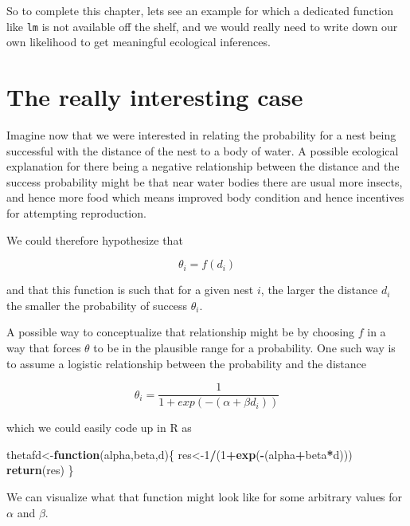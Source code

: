 \documentclass[
]{book}
\newenvironment{Shaded}{\begin{snugshade}}{\end{snugshade}}
\newcommand{\ControlFlowTok}[1]{\textcolor[rgb]{0.13,0.29,0.53}{\textbf{#1}}}
\newcommand{\DecValTok}[1]{\textcolor[rgb]{0.00,0.00,0.81}{#1}}
\newcommand{\KeywordTok}[1]{\textcolor[rgb]{0.13,0.29,0.53}{\textbf{#1}}}
\newcommand{\NormalTok}[1]{#1}
\newcommand{\OperatorTok}[1]{\textcolor[rgb]{0.81,0.36,0.00}{\textbf{#1}}}
\begin{document}
So to complete this chapter, lets see an example for which a dedicated function like \texttt{lm} is not available off the shelf, and we would really need to write down our own likelihood to get meaningful ecological inferences.

\hypertarget{the-really-interesting-case}{%
\section{The really interesting case}\label{the-really-interesting-case}}

Imagine now that we were interested in relating the probability for a nest being successful with the distance of the nest to a body of water. A possible ecological explanation for there being a negative relationship between the distance and the success probability might be that near water bodies there are usual more insects, and hence more food which means improved body condition and hence incentives for attempting reproduction.

We could therefore hypothesize that

\[\theta_i=f(d_i)\]

and that this function is such that for a given nest \(i\), the larger the distance \(d_i\) the smaller the probability of success \(\theta_i\).

A possible way to conceptualize that relationship might be by choosing \(f\) in a way that forces \(\theta\) to be in the plausible range for a probability. One such way is to assume a logistic relationship between the probability and the distance

\[\theta_i=\frac{1}{1+exp(-(\alpha+\beta d_i))}\]

which we could easily code up in R as

\begin{Shaded}
\begin{Highlighting}[]
\NormalTok{thetafd<-}\ControlFlowTok{function}\NormalTok{(alpha,beta,d)\{}
\NormalTok{  res<-}\DecValTok{1}\OperatorTok{/}\NormalTok{(}\DecValTok{1}\OperatorTok{+}\KeywordTok{exp}\NormalTok{(}\OperatorTok{-}\NormalTok{(alpha}\OperatorTok{+}\NormalTok{beta}\OperatorTok{*}\NormalTok{d)))}
  \KeywordTok{return}\NormalTok{(res)}
\NormalTok{\}}
\end{Highlighting}
\end{Shaded}

We can visualize what that function might look like for some arbitrary values for \(\alpha\) and \(\beta\).
\end{document}

